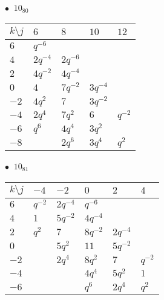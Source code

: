 \begin{minipage}{\linewidth}
$\bullet\ $ $10_{80}$ \vspace{0.5em} \\
\begin{tabular}{l|llll}
$k \setminus j$ & $6$ & $8$ & $10$ & $12$ \\
\hline
$6$ & $q^{-6}$ &  &  &  \\
$4$ & $2q^{-4}$ & $2q^{-6}$ &  &  \\
$2$ & $4q^{-2}$ & $4q^{-4}$ &  &  \\
$0$ & $4$ & $7q^{-2}$ & $3q^{-4}$ &  \\
$-2$ & $4q^{2}$ & $7$ & $3q^{-2}$ &  \\
$-4$ & $2q^{4}$ & $7q^{2}$ & $6$ & $q^{-2}$ \\
$-6$ & $q^{6}$ & $4q^{4}$ & $3q^{2}$ &  \\
$-8$ &  & $2q^{6}$ & $3q^{4}$ & $q^{2}$ \\
\end{tabular}
\vspace{2em}
\end{minipage}
%
\begin{minipage}{\linewidth}
$\bullet\ $ $10_{81}$ \vspace{0.5em} \\
\begin{tabular}{l|lllll}
$k \setminus j$ & $-4$ & $-2$ & $0$ & $2$ & $4$ \\
\hline
$6$ & $q^{-2}$ & $2q^{-4}$ & $q^{-6}$ &  &  \\
$4$ & $1$ & $5q^{-2}$ & $4q^{-4}$ &  &  \\
$2$ & $q^{2}$ & $7$ & $8q^{-2}$ & $2q^{-4}$ &  \\
$0$ &  & $5q^{2}$ & $11$ & $5q^{-2}$ &  \\
$-2$ &  & $2q^{4}$ & $8q^{2}$ & $7$ & $q^{-2}$ \\
$-4$ &  &  & $4q^{4}$ & $5q^{2}$ & $1$ \\
$-6$ &  &  & $q^{6}$ & $2q^{4}$ & $q^{2}$ \\
\end{tabular}
\vspace{2em}
\end{minipage}
%
